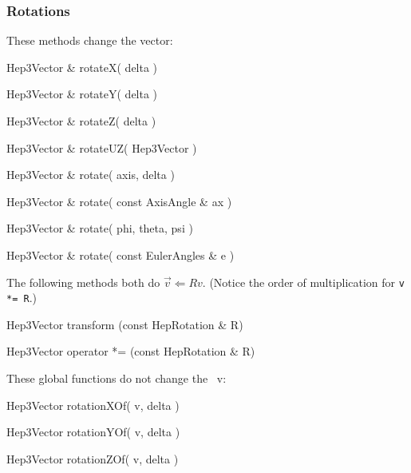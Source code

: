 \subsubsection{Rotations}

\noindent
These methods change the vector:

\begin{shortlist}
  \item Hep3Vector \& rotateX( delta ) \see{\ref{eq:rotX}}
  \item Hep3Vector \& rotateY( delta ) \see{\ref{eq:rotY}}
  \item Hep3Vector \& rotateZ( delta ) \see{\ref{eq:rotZ}, \ref{eq:rotZ:2}}
  \item Hep3Vector \& rotateUZ( Hep3Vector ) \see{\ref{eq:rotUz}}
\end{shortlist}

\begin{shortlist}
  \item Hep3Vector \& rotate( axis, delta ) \see{\ref{eq:axisrot}}
  \item Hep3Vector \& rotate( const AxisAngle \& ax ) \see{\ref{eq:axisrot}}
  \item Hep3Vector \& rotate( phi, theta, psi ) \see{\ref{eq:eulerrot}}
  \item Hep3Vector \& rotate( const EulerAngles \& e ) \see{\ref{eq:eulerrot}}
\end{shortlist}

\noindent 
The following methods both do $\vec{v} \Longleftarrow R v$.  
(Notice the order of multiplication for {\tt v *= R}.)

\begin{shortlist}
  \item Hep3Vector transform   (const HepRotation \& R) \see{\ref{eq:opstareq}}
  \item Hep3Vector operator *= (const HepRotation \& R) \see{\ref{eq:opstareq}}
\end{shortlist}


\noindent
These global functions do not change the \SV\ v:

\begin{shortlist}
  \item Hep3Vector rotationXOf( v, delta ) \see{\ref{eq:rotX}}
  \item Hep3Vector rotationYOf( v, delta ) \see{\ref{eq:rotY}}
  \item Hep3Vector rotationZOf( v, delta ) \see{\ref{eq:rotZ}, \ref{eq:rotZ:2}}
\end{shortlist}

